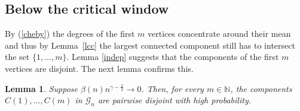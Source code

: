 \documentclass[12pt,a4paper]{article}
\numberwithin{equation}{section}
\newtheorem{lemma}[shared]{Lemma}
\begin{document}
\subsection{Below the critical window}

By (\ref{cheby}) the degrees of the first $m$ vertices concentrate around their mean and thus by Lemma~\ref{lcc} the largest connected component still has to intersect the set $\{1,\dots,m\}$. Lemma \ref{indep} suggests that the components of the first $m$ vertices are disjoint. The next lemma confirms this.

\begin{lemma}\label{disj}
Suppose $\beta(n)n^{\gamma-\frac12}\to0$. Then, for every $m\in\mathbb N$, the components $C(1),\ldots, C(m)$ in $\mathscr G_n$ are pairwise disjoint with high probability.
\end{lemma}
\end{document}

